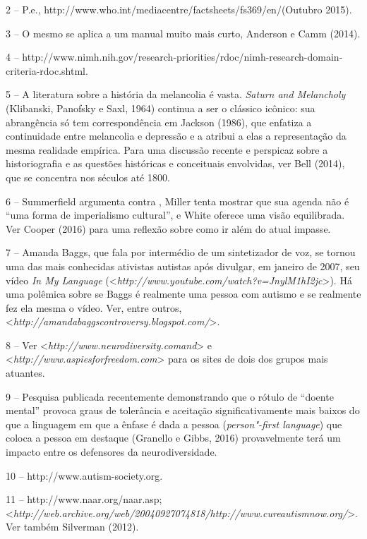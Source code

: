 2 -- P.e., http://www.who.int/mediacentre/factsheets/fs369/en/(Outubro
2015).

3 -- O mesmo se aplica a um manual muito mais curto, Anderson e Camm
(2014).

4 --
http://www.nimh.nih.gov/research-priorities/rdoc/nimh-research-domain-criteria-rdoc.shtml.

5 -- A literatura sobre a história da melancolia é vasta. \emph{Saturn
and Melancholy} (Klibanski, Panofsky e Saxl, 1964) continua a ser o
clássico icônico: sua abrangência só tem correspondência em Jackson
(1986), que enfatiza a continuidade entre melancolia e depressão e a
atribui a elas a representação da mesma realidade empírica. Para uma
discussão recente e perspicaz sobre a historiografia e as questões
históricas e conceituais envolvidas, ver Bell (2014), que se concentra
nos séculos até 1800.

6 -- Summerfield argumenta contra , Miller tenta mostrar que sua
agenda não é ``uma forma de imperialismo cultural'', e White oferece uma
visão equilibrada. Ver Cooper (2016) para uma reflexão sobre como ir
além do atual impasse.

7 -- Amanda Baggs, que fala por intermédio de um sintetizador de voz, se
tornou uma das mais conhecidas ativistas autistas após divulgar, em
janeiro de 2007, seu vídeo \emph{In My Language}
(\textless{}\emph{http://www.youtube.com/watch?v=JnylM1hI2jc}\textgreater{}). Há uma polêmica
sobre se Baggs é realmente uma pessoa com autismo e se realmente fez ela
mesma o vídeo. Ver, entre outros,
\textless{}\emph{http://amandabaggscontroversy.blogspot.com/}\textgreater{}.

8 -- Ver \textless{}\emph{http://www.neurodiversity.comand}\textgreater{} e
\textless{}\emph{http://www.aspiesforfreedom.com}\textgreater{} para os sites de dois dos grupos
mais atuantes.

9 -- Pesquisa publicada recentemente demonstrando que o rótulo de
``doente mental'' provoca graus de tolerância e aceitação
significativamente mais baixos do que a linguagem em que a ênfase é dada
a pessoa (\emph{person"-first language}) que coloca a pessoa em destaque
(Granello e Gibbs, 2016) provavelmente terá um impacto entre os
defensores da neurodiversidade.

10 -- http://www.autism-society.org.

11 -- http://www.naar.org/naar.asp;
\textless{}\emph{http://web.archive.org/web/20040927074818/http://www.cureautismnow.org/}\textgreater{}.
Ver também Silverman (2012).

